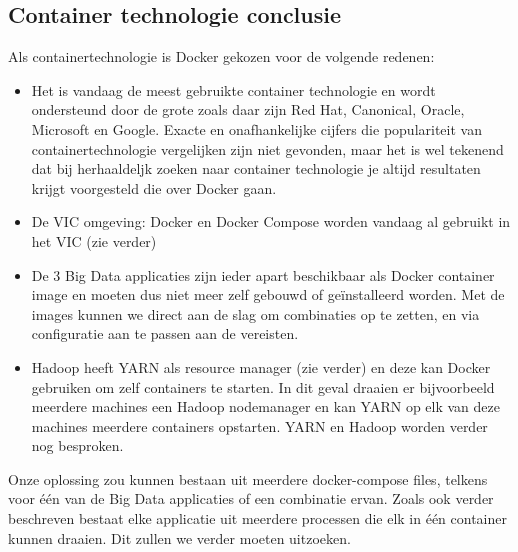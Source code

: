 \subsection{Container technologie conclusie}
Als containertechnologie is Docker gekozen voor de volgende redenen:
\newline
\begin{itemize}
    \item Het is vandaag de meest gebruikte container technologie en wordt ondersteund door de grote zoals daar zijn Red Hat, Canonical, Oracle, Microsoft en Google. Exacte en onafhankelijke cijfers die populariteit van containertechnologie vergelijken zijn niet gevonden, maar het is wel tekenend dat bij herhaaldeljk zoeken naar container technologie je altijd resultaten krijgt voorgesteld die over Docker gaan.
    \item De VIC omgeving: Docker en Docker Compose worden vandaag al gebruikt in het VIC (zie verder)
    \item De 3 Big Data applicaties zijn ieder apart beschikbaar als Docker container image en moeten dus niet meer zelf gebouwd of geïnstalleerd worden. Met de images kunnen we direct aan de slag om combinaties op te zetten, en via configuratie aan te passen aan de vereisten.
    \item Hadoop heeft YARN als resource manager (zie verder) en deze kan Docker gebruiken om zelf containers te starten. In dit geval draaien er bijvoorbeeld meerdere machines een Hadoop nodemanager en kan YARN op elk van deze machines meerdere containers opstarten. YARN en Hadoop worden verder nog besproken. \autocite{Hadoop2023a}
\end{itemize}

Onze oplossing zou kunnen bestaan uit meerdere docker-compose files, telkens voor één van de Big Data applicaties of een combinatie ervan. Zoals ook verder beschreven bestaat elke applicatie uit meerdere processen die elk in één container kunnen draaien. Dit zullen we verder moeten uitzoeken.
\newline
\newline

